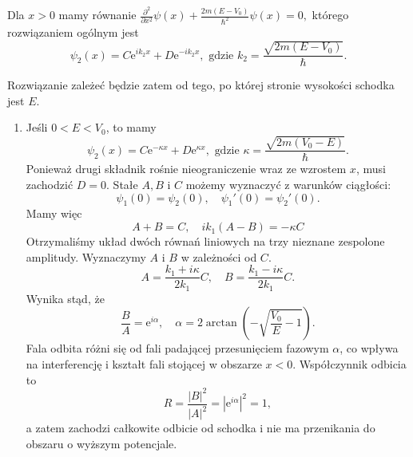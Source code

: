 Dla $x > 0$ mamy równanie $\frac{\partial^2}{\partial x^2} \psi(x) + \frac{2m(E - V_0)}{\hbar^2}\psi(x) = 0,$ którego rozwiązaniem ogólnym jest 
\begin{equation*}
	\psi_2(x) = C \mathrm{e}^{i k_2 x} + D \mathrm{e}^{-i k_2 x}, \text{ gdzie } k_2= \frac{\sqrt{2m(E - V_0)}}{\hbar}.
\end{equation*}

Rozwiązanie zależeć będzie zatem od tego, po której stronie wysokości schodka jest $E$.
\begin{enumerate}
	\item Jeśli $0 < E < V_0$, to mamy
	\begin{equation*}
		\psi_2(x) = C \mathrm{e}^{-\kappa x} + D \mathrm{e}^{\kappa x}, \text{ gdzie } \kappa = \frac{\sqrt{2m(V_0 - E)}}{\hbar}.
	\end{equation*}
	Ponieważ drugi składnik rośnie nieograniczenie wraz ze wzrostem $x$, musi zachodzić $D = 0$. Stałe $A, B$ i $C$ możemy wyznaczyć z warunków ciągłości:
	\begin{equation*}
		\psi_1(0) = \psi_2(0), \quad \psi_1'(0) = \psi_2'(0).
	\end{equation*}
	Mamy więc 
	\begin{equation*}
		A + B = C, \quad i k_1 (A - B) = -\kappa C
	\end{equation*}
	Otrzymaliśmy układ dwóch równań liniowych na trzy nieznane zespolone amplitudy. Wyznaczymy $A$ i $B$ w zależności od $C$.
	\begin{equation*}
		A = \frac{k_1 + i\kappa}{2k_1}C, \quad B = \frac{k_1 - i\kappa}{2k_1}C.
	\end{equation*}
	Wynika stąd, że
	\begin{equation*}
		\frac{B}{A} = \mathrm{e}^{i\alpha}, \quad \alpha = 2\arctan\left(-\sqrt{\frac{V_0}{E} - 1}\right).
	\end{equation*}
	Fala odbita różni się od fali padającej przesunięciem fazowym $\alpha$, co wpływa na interferencję i kształt fali stojącej w obszarze $x<0$.
	Współczynnik odbicia to
	\begin{equation*}
		R = \frac{|B|^2}{|A|^2} = |\mathrm{e}^{i\alpha}|^2 = 1,
	\end{equation*}
	a zatem zachodzi całkowite odbicie od schodka i nie ma przenikania do obszaru o wyższym potencjale.
	

\end{enumerate}

